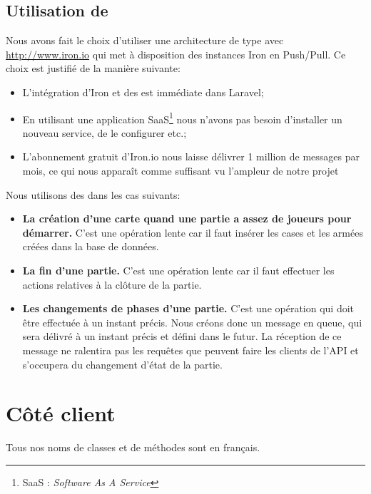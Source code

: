 	\subsection{Utilisation de \ppq{}}
		Nous avons fait le choix d'utiliser une architecture de type \ppq{} avec \url{http://www.iron.io} qui met à disposition des instances Iron en Push/Pull. Ce choix est justifié de la manière suivante:
		\begin{itemize}
			\item L'intégration d'Iron et des \ppq{} est immédiate dans Laravel;
			\item En utilisant une application SaaS\footnote{SaaS : \textit{Software As A Service}} nous n'avons pas besoin d'installer un nouveau service, de le configurer etc.;
			\item L'abonnement gratuit d'Iron.io nous laisse délivrer 1 million de messages par mois, ce qui nous apparaît comme suffisant vu l'ampleur de notre projet
		\end{itemize}\bigskip

		Nous utilisons des \ppq{} dans les cas suivants:
		\begin{itemize}
			\item \textbf{La création d'une carte quand une partie a assez de joueurs pour démarrer.} C'est une opération lente car il faut insérer les cases et les armées créées dans la base de données.
			\item \textbf{La fin d'une partie.} C'est une opération lente car il faut effectuer les actions relatives à la clôture de la partie.
			\item \textbf{Les changements de phases d'une partie.} C'est une opération qui doit être effectuée à un instant précis. Nous créons donc un message en queue, qui sera délivré à un instant précis et défini dans le futur. La réception de ce message ne ralentira pas les requêtes que peuvent faire les clients de l'API et s'occupera du changement d'état de la partie.
		\end{itemize}

\section{Côté client}
	Tous nos noms de classes et de méthodes sont en français.

